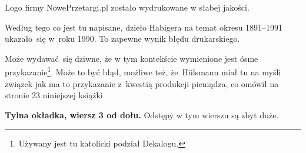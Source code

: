 \documentclass[a4paper,11pt]{article}
\begin{document}
\vspace{\spaceTwo}







 Logo firmy NowePrzetargi.pl zostało wydrukowane w słabej jakości.

\vspace{\spaceFour}



 Według tego co jest tu napisane, dzieło Habigera na
temat okresu 1891--1991 ukazało~się w~roku 1990. To zapewne wynik błędu
drukarskiego.

\vspace{\spaceFour}



 Może wydawać~się dziwne, że w tym kontekście wymienione jest ósme przykazanie\footnote{Używany jest tu katolicki podział Dekalogu.}. Może to być błąd, możliwe też, że~H\"{u}lsmann miał tu na myśli związek jak ma to przykazanie z~kwestią produkcji pieniądza, co omówił na stronie 23 niniejszej książki

\vspace{\spaceFour}



\textbf{Tylna okładka, wiersz 3 od dołu.} Odstępy w tym wierszu są
zbyt duże.








\end{document}

